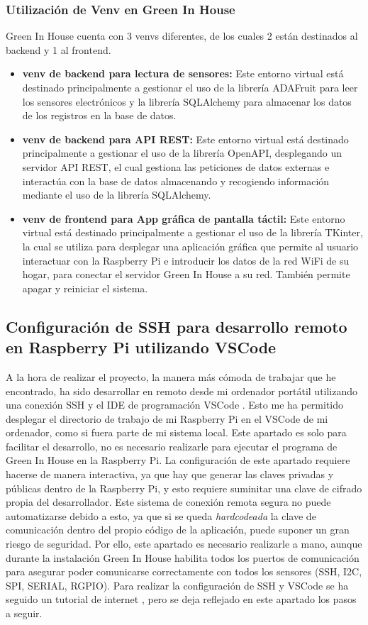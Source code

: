        \subsubsection{Utilización de Venv en Green In House}
        Green In House cuenta con 3 venvs \cite{wiki:venv} diferentes, de los cuales 2 están destinados al backend y 1 al frontend. 
        \begin{itemize}
            \item \textbf{venv de backend para lectura de sensores:} Este entorno virtual está destinado principalmente a gestionar el uso de la librería ADAFruit para leer los sensores electrónicos y la librería SQLAlchemy para almacenar los datos de los registros en la base de datos.
            \item \textbf{venv de backend para API REST:} Este entorno virtual está destinado principalmente a gestionar el uso de la librería OpenAPI, desplegando un servidor API REST, el cual gestiona las peticiones de datos externas e interactúa con la base de datos almacenando y recogiendo información mediante el uso de la librería SQLAlchemy.
            \item \textbf{venv de frontend para App gráfica de pantalla táctil:} Este entorno virtual está destinado principalmente a gestionar el uso de la librería TKinter, la cual se utiliza para desplegar una aplicación gráfica que permite al usuario interactuar con la Raspberry Pi e introducir los datos de la red WiFi de su hogar, para conectar el servidor Green In House a su red. También permite apagar y reiniciar el sistema.
        \end{itemize}

    \subsection{Configuración de SSH para desarrollo remoto en Raspberry Pi utilizando VSCode}
    A la hora de realizar el proyecto, la manera más cómoda de trabajar que he encontrado, ha sido desarrollar en remoto desde mi ordenador portátil utilizando una conexión SSH \cite{wiki:ssh} y el IDE de programación VSCode \cite{wiki:vscode}. Esto me ha permitido desplegar el directorio de trabajo de mi Raspberry Pi en el VSCode de mi ordenador, como si fuera parte de mi sistema local. Este apartado es solo para facilitar el desarrollo, no es necesario realizarle para ejecutar el programa de Green In House en la Raspberry Pi. 
    La configuración de este apartado requiere hacerse de manera interactiva, ya que hay que generar las claves privadas y públicas dentro de la Raspberry Pi, y esto requiere suminitar una clave de cifrado propia del desarrollador. Este sistema de conexión remota segura no puede automatizarse debido a esto, ya que si se queda \textit{hardcodeada} la clave de comunicación dentro del propio código de la aplicación, puede suponer un gran riesgo de seguridad. Por ello, este apartado es necesario realizarle a mano, aunque durante la instalación Green In House habilita todos los puertos de comunicación para asegurar poder comunicarse correctamente con todos los sensores (SSH, I2C, SPI, SERIAL, RGPIO). Para realizar la configuración de SSH y VSCode se ha seguido un tutorial de internet \cite{wiki:ssh_configuracion}, pero se deja reflejado en este apartado los pasos a seguir.

